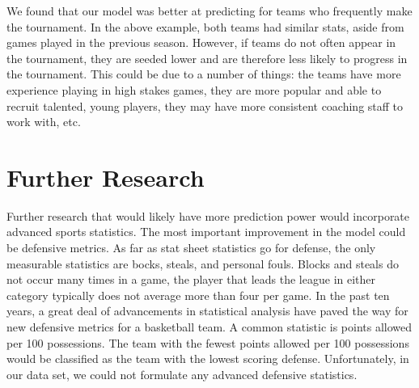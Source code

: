\documentclass[]{scrartcl}
\begin{document}
We found that our model was better at predicting for teams who frequently make the tournament. In the above example, both teams had similar stats, aside from games played in the previous season. However, if teams do not often appear in the tournament, they are seeded lower and are therefore less likely to progress in the tournament. This could be due to a number of things: the teams have more experience playing in high stakes games, they are more popular and able to recruit talented, young players, they may have more consistent coaching staff to work with, etc.

\section*{Further Research}
Further research that would likely have more prediction power would incorporate advanced sports statistics. The most important improvement in the model could be defensive metrics. As far as stat sheet statistics go for defense, the only measurable statistics are bocks, steals, and personal fouls. Blocks and steals do not occur many times in a game, the  player that leads the league in either category typically does not average more than four per game. In the past ten years, a great deal of advancements in statistical analysis have paved the way for new defensive metrics for a basketball team. A common statistic is points allowed per 100 possessions. The team with the fewest points allowed per 100 possessions would be classified as the team with the lowest scoring defense. Unfortunately, in our data set, we could not formulate any advanced defensive statistics.
\end{document}
